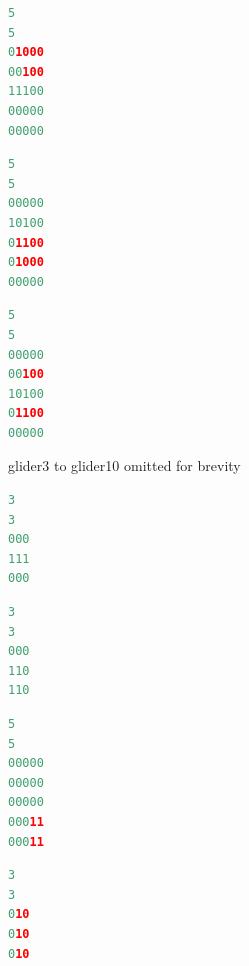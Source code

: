 \documentclass[12pt]{report}
\begin{document}
\begin{lstlisting}[language=Python, caption=glider0.txt]
5
5
01000
00100
11100
00000
00000
\end{lstlisting}

\begin{lstlisting}[language=Python, caption=glider1.txt]
5
5
00000
10100
01100
01000
00000
\end{lstlisting}

\begin{lstlisting}[language=Python, caption=glider2.txt]
5
5
00000
00100
10100
01100
00000
\end{lstlisting}

glider3 to glider10 omitted for brevity

\begin{lstlisting}[language=Python, caption=horizontal.txt]
3
3
000
111
000
\end{lstlisting}

\begin{lstlisting}[language=Python, caption=square.txt]
3
3
000
110
110
\end{lstlisting}

\begin{lstlisting}[language=Python, caption=square2.txt]
5
5
00000
00000
00000
00011
00011
\end{lstlisting}

\begin{lstlisting}[language=Python, caption=vertical.txt]
3
3
010
010
010
\end{lstlisting}
\end{document}
